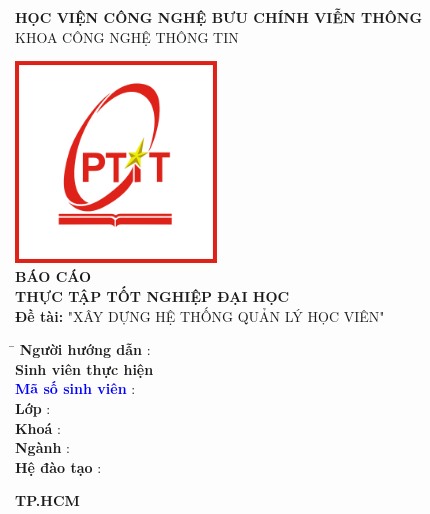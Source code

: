 \documentclass[report.tex]{subfiles}
\begin{document}
\pagebreak

\begin{titlepage}
    \begin{center}
        \textbf{HỌC VIỆN CÔNG NGHỆ BƯU CHÍNH VIỄN THÔNG}\\
        KHOA CÔNG NGHỆ THÔNG TIN\\
        \vspace{1cm}
        \vspace{-8pt}\hrulefill\raisebox{-2.1pt}\quad\decofourleft\decotwo\decofourright\quad\hrulefill

        \vspace{2cm}
        \centering\includegraphics[width=0.4\textwidth]{../meta/logo.PTIT.png}\\
        \vspace{2cm}
        \textbf{\Huge BÁO CÁO\\
            THỰC TẬP TỐT NGHIỆP ĐẠI HỌC}\\
        \vspace{1cm}
        \textbf{\Large Đề tài:} {\large "XÂY DỰNG HỆ THỐNG QUẢN LÝ HỌC VIÊN"} \\

        \vfill

        \begin{tabbing}
          \hspace{8cm} \= \hspace{10cm} \kill
          \textbf{Người hướng dẫn} \> :  \\
          \textbf{Sinh viên thực hiện} \> \\
          \textbf{\textcolor{blue}{Mã số sinh viên}} \> : \\
          \textbf{Lớp} \> : \\
          \textbf{Khoá} \> : \\
          \textbf{Ngành} \> : \\
          \textbf{Hệ đào tạo} \> : \\
        \end{tabbing}

    \end{center}
    \vfill
    \begin{center}
        \textbf{TP.HCM}
    \end{center}

\end{titlepage}

\pagebreak
\end{document}
